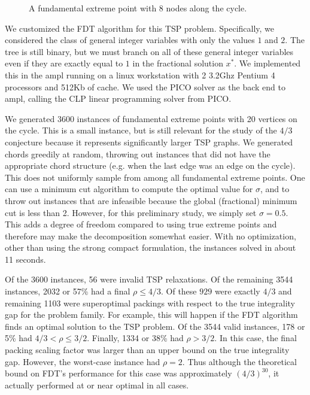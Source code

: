 \documentclass[11pt]{article}
\begin{document}
\begin{figure}
\begin{center}

\end{center}
\caption{A fundamental extreme point with 8 nodes along the cycle.}
\label{fig:fundExtreme}
\end{figure}

We customized the FDT algorithm for this TSP problem.  Specifically,
we considered the class of general integer variables with only the
values $1$ and $2$.  The tree is still binary, but we must branch on
all of these general integer variables even if they are exactly equal
to $1$ in the fractional solution $x^*$.  We implemented this in the
ampl running on a linux workstation with 2 3.2Ghz Pentium 4 processors
and 512Kb of cache.  We used the PICO solver as the back end to ampl,
calling the CLP linear programming solver from PICO.

We generated 3600 instances of fundamental extreme points with 20
vertices on the cycle.  This is a small instance, but is still
relevant for the study of the $4/3$ conjecture because it represents
significantly larger TSP graphs.  We generated chords greedily at
random, throwing out instances that did not have the appropriate chord
structure (e.g. when the last edge was an edge on the cycle).  This
does not uniformly sample from among all fundamental extreme points.
One can use a minimum cut algorithm to compute the optimal value for
$\sigma$, and to throw out instances that are infeasible because the
global (fractional) minimum cut is less than 2.  However, for this
preliminary study, we simply set $\sigma = 0.5$.  This adds a degree
of freedom compared to using true extreme points and therefore may
make the decomposition somewhat easier.  With no optimization, other
than using the strong compact formulation, the instances solved in
about 11 seconds.

Of the 3600 instances, 56 were invalid TSP relaxations.  Of the
remaining 3544 instances, 2032 or 57\% had a final $\rho \le 4/3$.  Of
these $929$ were exactly $4/3$ and remaining 1103 were superoptimal
packings with respect to the true integrality gap for the problem
family.  For example, this will happen if the FDT algorithm finds an
optimal solution to the TSP problem.  Of the 3544 valid instances, 178
or 5\% had $4/3 < \rho \le 3/2$.  Finally, 1334 or 38\% had $\rho >
3/2$.  In this case, the final packing scaling factor was larger than
an upper bound on the true integrality gap.  However, the worst-case
instance had $\rho = 2$.  Thus although the theoretical bound on FDT's
performance for this case was approximately $(4/3)^{30}$, it actually
performed at or near optimal in all cases.
\end{document}
